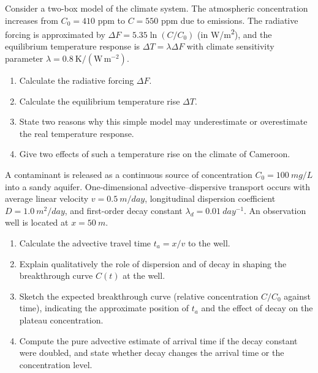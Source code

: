 \documentclass[11pt]{article}
\newcounter{popsec}
\newcounter{popsub}
\newcommand{\courssub}[1]{%
  \stepcounter{popsub}%
  \par\vspace{9pt}\noindent{\popxbold\fontsize{11.5}{13}\selectfont\color{popink}{\color{poporange}\thepopsec.\thepopsub}\hspace{6pt}#1}\par\nopagebreak\vspace{4pt}
}
\begin{document}
\begin{exercice}
Consider a two-box model of the climate system. The atmospheric  concentration increases from $C_0 = 410$ ppm to $C = 550$ ppm due to emissions. The radiative forcing is approximated by $\Delta F = 5.35 \ln(C/C_0)$ (in \si{W/m^2}), and the equilibrium temperature response is $\Delta T = \lambda \Delta F$ with climate sensitivity parameter $\lambda = 0.8\ \mathrm{K/(W\,m^{-2})}$.
\begin{enumerate}
\item Calculate the radiative forcing $\Delta F$.
\item Calculate the equilibrium temperature rise $\Delta T$.
\item State two reasons why this simple model may underestimate or overestimate the real temperature response.
\item Give two effects of such a temperature rise on the climate of Cameroon.
\end{enumerate}
\end{exercice}

\begin{exercice}
A contaminant is released as a continuous source of concentration $C_0 = \SI{100}{mg/L}$ into a sandy aquifer. One-dimensional advective--dispersive transport occurs with average linear velocity $v = \SI{0.5}{m/day}$, longitudinal dispersion coefficient $D = \SI{1.0}{m^2/day}$, and first-order decay constant $\lambda_d = \SI{0.01}{day^{-1}}$. An observation well is located at $x = \SI{50}{m}$.
\begin{enumerate}
\item Calculate the advective travel time $t_a = x/v$ to the well.
\item Explain qualitatively the role of dispersion and of decay in shaping the breakthrough curve $C(t)$ at the well.
\item Sketch the expected breakthrough curve (relative concentration $C/C_0$ against time), indicating the approximate position of $t_a$ and the effect of decay on the plateau concentration.
\item Compute the pure advective estimate of arrival time if the decay constant were doubled, and state whether decay changes the arrival time or the concentration level.
\end{enumerate}
\end{exercice}

\courssub{I prepare for the GCE}
\end{document}
